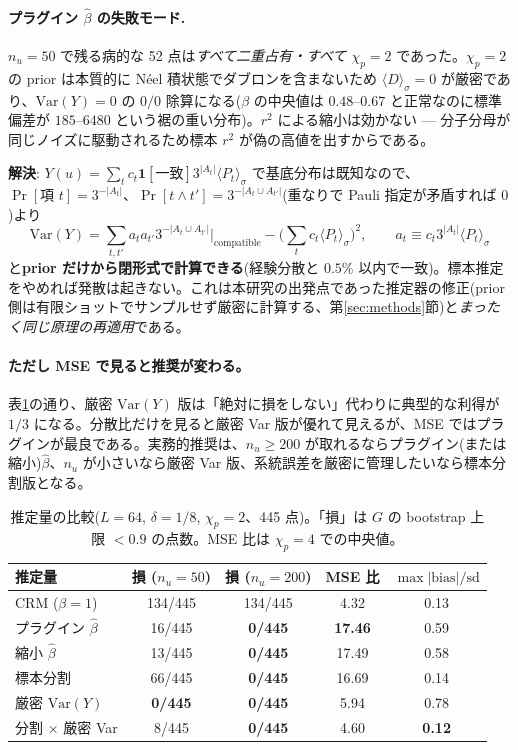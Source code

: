 \documentclass[11pt,a4paper]{ltjsarticle}
\newcommand{\ev}[1]{\langle #1\rangle}
\begin{document}
\paragraph{プラグイン $\hat\beta$ の失敗モード.}$n_u=50$ で残る病的な 52 点は\emph{すべて二重占有・すべて $\chi_p=2$} であった。$\chi_p=2$ の prior は本質的に N\'eel 積状態でダブロンを含まないため $\ev{D}_\sigma=0$ が厳密であり、$\mathrm{Var}(Y)=0$ の $0/0$ 除算になる($\beta$ の中央値は $0.48$--$0.67$ と正常なのに標準偏差が $185$--$6480$ という裾の重い分布)。$r^2$ による縮小は効かない --- 分子分母が同じノイズに駆動されるため標本 $r^2$ が偽の高値を出すからである。

\textbf{解決}: $Y(u)=\sum_t c_t\mathbf 1[\text{一致}]3^{|A_t|}\ev{P_t}_\sigma$ で基底分布は既知なので、$\Pr[\text{項 }t]=3^{-|A_t|}$、$\Pr[t\wedge t']=3^{-|A_t\cup A_{t'}|}$(重なりで Pauli 指定が矛盾すれば $0$)より
\begin{equation}
  \mathrm{Var}(Y)=\sum_{t,t'} a_t a_{t'} 3^{-|A_t\cup A_{t'}|}\Big|_{\text{compatible}} - \Big(\sum_t c_t\ev{P_t}_\sigma\Big)^2,
  \qquad a_t \equiv c_t 3^{|A_t|}\ev{P_t}_\sigma
\end{equation}
と\textbf{prior だけから閉形式で計算できる}(経験分散と $0.5\%$ 以内で一致)。標本推定をやめれば発散は起きない。これは本研究の出発点であった推定器の修正(prior 側は有限ショットでサンプルせず厳密に計算する、第\ref{sec:methods}節)と\emph{まったく同じ原理の再適用}である。

\paragraph{ただし MSE で見ると推奨が変わる。}表\ref{tab:betacomp}の通り、厳密 $\mathrm{Var}(Y)$ 版は「絶対に損をしない」代わりに典型的な利得が $1/3$ になる。分散比だけを見ると厳密 Var 版が優れて見えるが、MSE ではプラグインが最良である。実務的推奨は、$n_u\ge200$ が取れるならプラグイン(または縮小)$\hat\beta$、$n_u$ が小さいなら厳密 Var 版、系統誤差を厳密に管理したいなら標本分割版となる。

\begin{table}[t]
\centering\small
\caption{推定量の比較($L=64$, $\delta=1/8$, $\chi_p=2$、445 点)。「損」は $G$ の bootstrap 上限 $<0.9$ の点数。MSE 比は $\chi_p=4$ での中央値。}
\label{tab:betacomp}
\begin{tabular}{@{}lcccc@{}}
\toprule
推定量 & 損 ($n_u{=}50$) & 損 ($n_u{=}200$) & MSE 比 & $\max|\text{bias}|/\text{sd}$ \\
\midrule
CRM ($\beta=1$)          & 134/445 & 134/445 & 4.32  & 0.13 \\
プラグイン $\hat\beta$   & 16/445  & \textbf{0/445} & \textbf{17.46} & 0.59 \\
縮小 $\hat\beta$         & 13/445  & \textbf{0/445} & 17.49 & 0.58 \\
標本分割                 & 66/445  & \textbf{0/445} & 16.69 & 0.14 \\
厳密 $\mathrm{Var}(Y)$   & \textbf{0/445} & \textbf{0/445} & 5.94 & 0.78 \\
分割 $\times$ 厳密 Var   & 8/445   & \textbf{0/445} & 4.60  & \textbf{0.12} \\
\bottomrule
\end{tabular}
\end{table}
\end{document}
